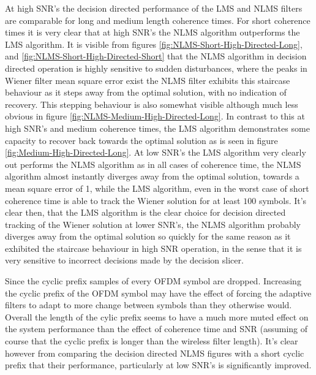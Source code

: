 At high SNR's the decision directed performance of the LMS and %
NLMS filters are comparable for long and medium length coherence %
times. For short coherence times it is very clear that at high %
SNR's the NLMS algorithm outperforms the LMS algorithm. It is visible from %
figures \ref{fig:NLMS-Short-High-Directed-Long}, and
\ref{fig:NLMS-Short-High-Directed-Short} that the NLMS algorithm %
in decision directed operation is highly sensitive to sudden disturbances, %
where the peaks in Wiener filter mean square error exist the %
NLMS filter exhibits this staircase behaviour as it steps away %
from the optimal solution, with no indication of recovery. This %
stepping behaviour is also somewhat visible although much less %
obvious in figure \ref{fig:NLMS-Medium-High-Directed-Long}. %
In contrast to this at high SNR's and medium coherence times, %
the LMS algorithm demonstrates some capacity to recover %
back towards the optimal solution as is seen in figure %
\ref{fig:Medium-High-Directed-Long}. At low SNR's the %
LMS algorithm very clearly out performs the NLMS algorithm %
as in all cases of coherence time, the NLMS algorithm almost %
instantly diverges away from the optimal solution, towards %
a mean square error of 1, while the LMS algorithm, even in the %
worst case of short coherence time is able to track the %
Wiener solution for at least $100$ symbols. It's clear then, that %
the LMS algorithm is the clear choice for decision directed tracking %
of the Wiener solution at lower SNR's, the NLMS algorithm probably %
diverges away from the optimal solution so quickly for the same %
reason as it exhibited the staircase behaviour in high SNR operation, in %
the sense that it is very sensitive to incorrect decisions made by the %
decision slicer. 

Since the cyclic prefix samples of every OFDM symbol are dropped. %
Increasing the cyclic prefix of the OFDM symbol may have the %
effect of forcing the adaptive filters to adapt to more change %
between symbols than they otherwise would. Overall the length %
of the cylic prefix seems to have a much more %
muted effect on the system performance than the effect of %
coherence time and SNR (assuming of course that the cyclic %
prefix is longer than the wireless filter length). It's clear however %
from comparing the decision directed NLMS figures with a short %
cyclic prefix that their performance, particularly at low SNR's is %
significantly improved.

